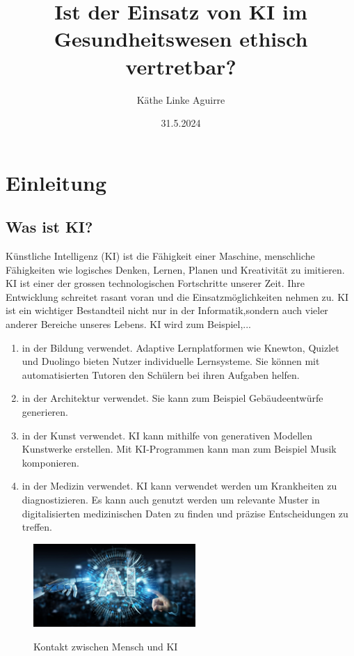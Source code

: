 \documentclass{report}
\title{Ist der Einsatz von KI im Gesundheitswesen ethisch vertretbar?}
\author{Käthe Linke Aguirre}
\date{31.5.2024}
\begin{document}
\maketitle


\tableofcontents

\chapter{Einleitung}

\section{Was ist KI?}
  
Künstliche Intelligenz (KI) ist die Fähigkeit einer Maschine, menschliche Fähigkeiten
wie logisches Denken, Lernen, Planen und Kreativität zu imitieren. KI ist einer der 
grossen technologischen Fortschritte unserer Zeit. Ihre Entwicklung schreitet 
rasant voran und die Einsatzmöglichkeiten nehmen zu. KI ist ein wichtiger Bestandteil nicht nur in der 
Informatik,sondern auch vieler anderer Bereiche unseres Lebens. 
\newline
KI wird zum Beispiel,... 
\begin{enumerate}
    \item in der Bildung verwendet. Adaptive Lernplatformen wie Knewton, Quizlet und Duolingo
    bieten Nutzer individuelle Lernsysteme. Sie können mit automatisierten Tutoren den Schülern bei 
    ihren Aufgaben helfen.
    \item in der Architektur verwendet. Sie kann zum Beispiel Gebäudeentwürfe generieren.
    \item in der Kunst verwendet. KI kann mithilfe von generativen Modellen Kunstwerke erstellen.
    Mit KI-Programmen kann man zum Beispiel Musik komponieren.
    \item in der Medizin verwendet. KI kann verwendet werden um Krankheiten zu diagnostizieren. 
    Es kann auch genutzt werden um relevante Muster in digitalisierten medizinischen 
    Daten zu finden und präzise Entscheidungen zu treffen.
\end{enumerate}

\begin{figure}
    \centering
    \includegraphics[width=0.55\textwidth]{R.jpg}
    \label{fig:R}
    \caption{Kontakt zwischen Mensch und KI}
    \end{figure}
\end{document}
